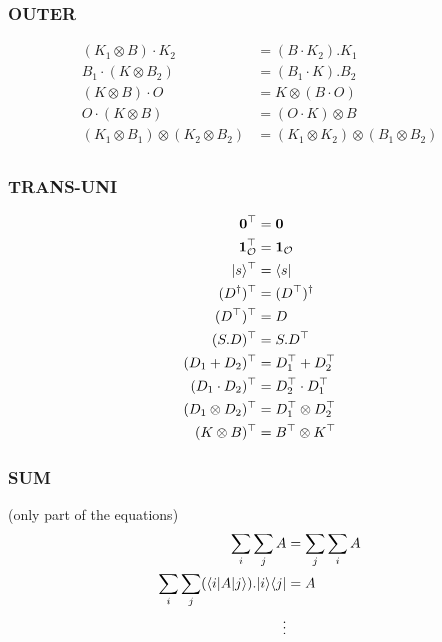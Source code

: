 \subsubsection*{\textsf{OUTER}}
\begin{align*}
    (K_1 \otimes B) \cdot K_2 & = (B \cdot K_2).K_1 \\
    B_1 \cdot (K \otimes B_2) & = (B_1 \cdot K).B_2 \\
    (K \otimes B) \cdot O & = K \otimes (B \cdot O)\\
    O \cdot (K \otimes B) & = (O \cdot K) \otimes B\\
    (K_1 \otimes B_1) \otimes (K_2 \otimes B_2) & = (K_1 \otimes K_2) \otimes (B_1 \otimes B_2) \\
\end{align*}

\subsubsection*{\textsf{TRANS-UNI}}
\begin{align*}
  \mathbf{0}^\top & = \mathbf{0} \\
  \mathbf{1}_\mathcal{O}^\top & = \mathbf{1}_\mathcal{O} \\
  |s\rangle^\top & = \langle s| \\
  (D^\dagger)^\top & = (D^\top)^\dagger \\
  (D^\top)^\top & = D \\
  (S . D)^\top & = S . D^\top \\
  (D_1 + D_2)^\top & = D_1^\top + D_2^\top \\
  (D_1 \cdot D_2)^\top & = D_2^\top \cdot D_1^\top \\
  (D_1 \otimes D_2)^\top & = D_1^\top \otimes D_2^\top \\
  (K \otimes B)^\top & = B^\top \otimes K^\top \\
\end{align*}

\subsubsection*{\textsf{SUM}}
(only part of the equations)
\begin{align*}
    \sum_i \sum_j A & = \sum_j \sum_i A \\
    \sum_i \sum_j (\langle i| A |j\rangle).|i\rangle\langle j|  & = A \\
    \vdots
\end{align*}